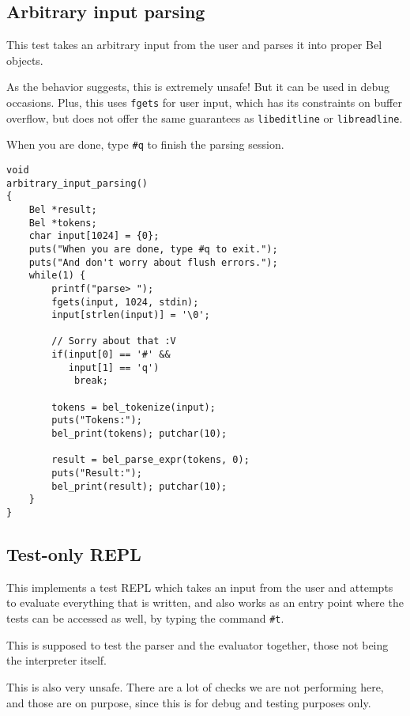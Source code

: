 \documentclass[openright,a4paper,twoside,12pt]{memoir}
\begin{document}
\subsection{Arbitrary input parsing}
\label{sec:org3cc5315}

This test  takes an arbitrary input  from the user and  parses it into
proper Bel objects.

As the behavior suggests, this is extremely unsafe! But it can be used
in debug  occasions. Plus, this uses  \texttt{fgets} for user input,  which has
its  constraints on  buffer  overflow,  but does  not  offer the  same
guarantees as \texttt{libeditline} or \texttt{libreadline}.

When you are done, type \texttt{\#q} to finish the parsing session.

\begin{verbatim}
void
arbitrary_input_parsing()
{
    Bel *result;
    Bel *tokens;
    char input[1024] = {0};
    puts("When you are done, type #q to exit.");
    puts("And don't worry about flush errors.");
    while(1) {
        printf("parse> ");
        fgets(input, 1024, stdin);
        input[strlen(input)] = '\0';

        // Sorry about that :V
        if(input[0] == '#' &&
           input[1] == 'q')
            break;

        tokens = bel_tokenize(input);
        puts("Tokens:");
        bel_print(tokens); putchar(10);

        result = bel_parse_expr(tokens, 0);
        puts("Result:");
        bel_print(result); putchar(10);
    }
}
\end{verbatim}

\subsection{Test-only REPL}
\label{sec:orga7009ee}

This implements  a test REPL  which takes an  input from the  user and
attempts to evaluate everything that is  written, and also works as an
entry point  where the tests  can be accessed  as well, by  typing the
command \texttt{\#t}.

This is supposed to test the  parser and the evaluator together, those
not being the interpreter itself.

This  is also  very unsafe.  There  are a  lot  of checks  we are  not
performing here, and those are on purpose, since this is for debug and
testing purposes only.
\end{document}
